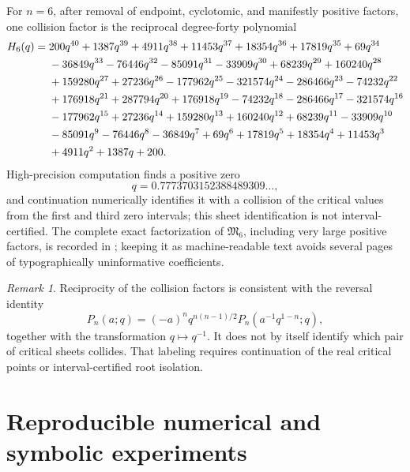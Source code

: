 \documentclass[11pt,oneside]{article}
\theoremstyle{definition}
\theoremstyle{remark}
\newtheorem{remark}[theorem]{Remark}
\theoremstyle{plain}
\theoremstyle{definition}
\theoremstyle{remark}
\numberwithin{equation}{section}
\numberwithin{figure}{section}
\numberwithin{table}{section}
\let\reporttopsection\section
\let\reportsubsection\subsection
\let\reportsubsubsection\subsubsection
\let\chapter\reporttopsection
\let\section\reportsubsection
\let\subsection\reportsubsubsection
\begin{document}
For \(n=6\), after removal of endpoint, cyclotomic, and manifestly positive
factors, one collision factor is the reciprocal degree-forty polynomial
\begin{align}
 H_6(q)={}&200q^{40}+1387q^{39}+4911q^{38}+11453q^{37}
 +18354q^{36}+17819q^{35}+69q^{34}\notag\\
 &-36849q^{33}-76446q^{32}-85091q^{31}-33909q^{30}
 +68239q^{29}+160240q^{28}\notag\\
 &+159280q^{27}+27236q^{26}-177962q^{25}-321574q^{24}
 -286466q^{23}-74232q^{22}\notag\\
 &+176918q^{21}+287794q^{20}+176918q^{19}-74232q^{18}
 -286466q^{17}-321574q^{16}\notag\\
 &-177962q^{15}+27236q^{14}+159280q^{13}+160240q^{12}
 +68239q^{11}-33909q^{10}\notag\\
 &-85091q^9-76446q^8-36849q^7+69q^6+17819q^5
 +18354q^4+11453q^3\notag\\
 &+4911q^2+1387q+200.
 \label{eq:H6-polynomial}
\end{align}
High-precision computation finds a positive zero
\[
 q=0.7773703152388489309\ldots,
\]
and continuation numerically identifies it with a collision of the critical
values from the first and third zero intervals; this sheet identification is
not interval-certified.  The complete exact factorization of
\(\mathfrak M_6\), including very large positive factors, is recorded in
; keeping it as machine-readable
text avoids several pages of typographically uninformative coefficients.

\begin{remark}
Reciprocity of the collision factors is consistent with the reversal identity
\[
 P_n(a;q)=(-a)^nq^{n(n-1)/2}
 P_n\!\left(a^{-1}q^{1-n};q\right),
\]
together with the transformation \(q\mapsto q^{-1}\).  It does not by itself
identify which pair of critical sheets collides.  That labeling requires
continuation of the real critical points or interval-certified root isolation.
\end{remark}

\chapter{Reproducible numerical and symbolic experiments}
\label{app:reproducibility}
\end{document}
